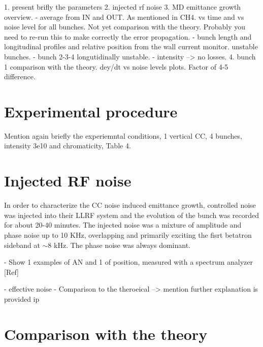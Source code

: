 \vspace*{-1mm}

1. present brifly the parameters
2. injected rf noise
3. MD emittance growth overview. 
    - average from IN and OUT. As mentioned in CH4. vs time and vs noise level for all bunches. Not yet comparison with the theory. Probably you need to re-run this to make correctly the error propagation. 
    - bunch length and longitudinal profiles and relative position from the wall current monitor.  unstable bunches.
    - bunch 2-3-4 longutidinally unstable.
    - intensity --> no losses.
4. bunch 1 comparison with the theory. dey/dt vs noise levels plots. Factor of 4-5 difference. 


\section{Experimental procedure}

Mention again briefly the experiemntal conditions, 1 vertical CC, 4 bunches, intensity 3e10 and chromaticity, Table 4. 


 \section{Injected RF noise} 

 In order to characterize the CC noise induced emittance growth, controlled noise was injected into their LLRF system and the evolution of the bunch was recorded for about 20-40 minutes. The injected noise was a mixture of amplitude and phase noise up to 10 KHz, overlapping and primarily exciting the fisrt betatron sideband at $\sim 8$ kHz. The phase noise was always dominant. 
 
 - Show 1 examples of AN and 1 of position, measured with a spectrum analyzer [Ref]

 - effective noise
 - Comparison to the theroeical --> mention further explanation is provided ip 

 \section{Comparison with the theory}\label{sec:MD2018_vs_theory}